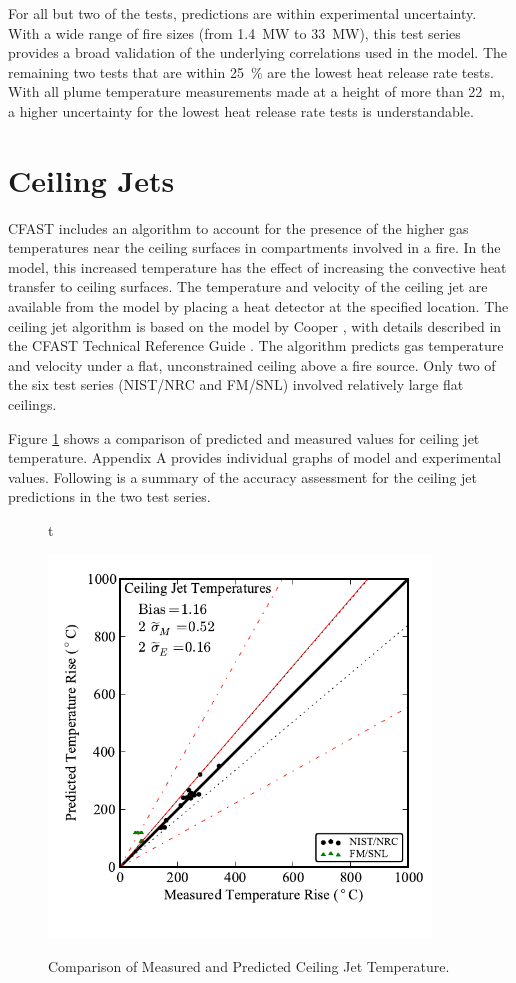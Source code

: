 For all but two of the tests, predictions are within experimental uncertainty.  With a wide range of fire sizes (from 1.4~MW to 33~MW), this test series provides a broad validation of the underlying correlations used in the model.  The remaining two tests that are within 25~\% are the lowest heat release rate tests.  With all plume temperature measurements made at a height of more than 22~m, a higher uncertainty for the lowest heat release rate tests is understandable.

\section{Ceiling Jets}

CFAST includes an algorithm to account for the presence of the higher gas temperatures near the ceiling surfaces in compartments involved in a fire.  In the model, this increased temperature has the effect of increasing the convective heat transfer to ceiling surfaces.  The temperature and velocity of the ceiling jet are available from the model by placing a heat detector at the specified location.  The ceiling jet algorithm is based on the model by Cooper \cite{Cooper:1991}, with details described in the CFAST Technical Reference Guide \cite{CFAST_Tech_Guide_6}.  The algorithm predicts gas temperature and velocity under a flat, unconstrained ceiling above a fire source.  Only two of the six test series (NIST/NRC and FM/SNL) involved relatively large flat ceilings.  

Figure \ref{fig:Ceiling_Jet_Scatter} shows a comparison of predicted and measured values for ceiling jet temperature. Appendix A provides individual graphs of model and experimental values. Following is a summary of the accuracy assessment for the ceiling jet predictions in the two test series.

\begin{figure}{t}
\begin{center}
\includegraphics[width=4.0in]{FIGURES/ScatterPlots/Ceiling_Jet_Temperature}  \\
\end{center}
\caption{Comparison of Measured and Predicted Ceiling Jet Temperature.} \label{fig:Ceiling_Jet_Scatter}
\end{figure}

